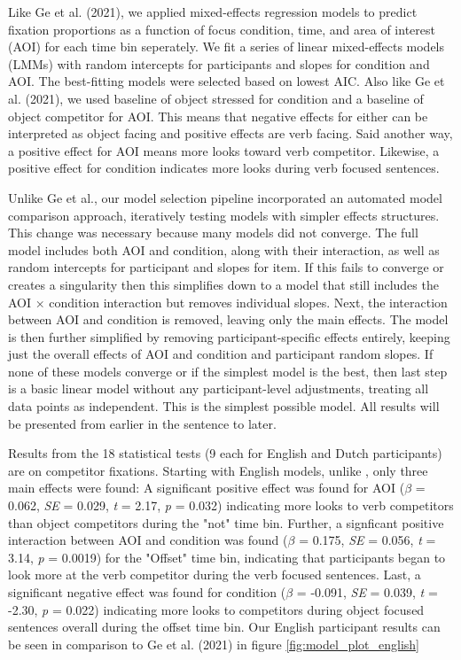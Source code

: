 Like Ge et al. (2021), we applied mixed-effects regression models to predict fixation proportions as a function of focus condition, time, and area of interest (AOI) for each time bin seperately. We fit a series of linear mixed-effects models (LMMs) with random intercepts for participants and slopes for condition and AOI. The best-fitting models were selected based on lowest AIC. Also like Ge et al. (2021), we used baseline of object stressed for condition and a baseline of object competitor for AOI. This means that negative effects for either can be interpreted as object facing and positive effects are verb facing. Said another way, a positive effect for AOI means more looks toward verb competitor. Likewise, a positive effect for condition indicates more looks during verb focused sentences.

Unlike Ge et al., our model selection pipeline incorporated an automated model comparison approach, iteratively testing models with simpler effects structures. This change was necessary because many models did not converge. The full model includes both AOI and condition, along with their interaction, as well as random intercepts for participant and slopes for item. If this fails to converge or creates a singularity then
this simplifies down to a model that still includes the AOI × condition interaction but removes individual slopes. Next, the interaction between AOI and condition is removed, leaving only the main effects. The model is then further simplified by removing participant-specific effects entirely, keeping just the overall effects of AOI and condition and participant random slopes. If none of these models converge or if the simplest model is the best, then last step is a basic linear model without any participant-level adjustments, treating all data points as independent. This is the simplest possible model. All results will be presented from earlier in the sentence to later.

Results from the 18 statistical tests (9 each for English and Dutch participants) are on competitor fixations. Starting with English models, unlike \citep{Ge2021}, only three main effects were found: A significant positive effect was found for AOI ($\beta$ = 0.062, \textit{SE} = 0.029, \textit{t} = 2.17, \textit{p} = 0.032) indicating more looks to verb competitors than object competitors during the "not" time bin. Further, a signficant positive interaction between AOI and condition was found ($\beta$ = 0.175, \textit{SE} = 0.056, \textit{t} = 3.14, \textit{p} = 0.0019) for the "Offset" time bin, indicating that participants began to look more at the verb competitor during the verb focused sentences. Last, a significant negative effect was found for condition ($\beta$ = -0.091, \textit{SE} = 0.039, \textit{t} = -2.30, \textit{p} = 0.022) indicating more looks to competitors during object focused sentences overall during the offset time bin. Our English participant results can be seen in comparison to Ge et al. (2021) in figure \ref{fig:model_plot_english}

